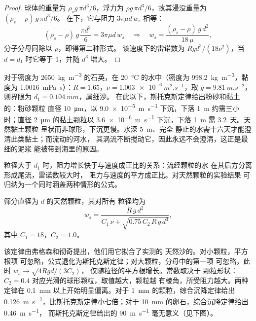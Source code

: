 \begin{proof}
球体的重量为 $\rho_s g\,\pi d^3/6$，浮力为
$\rho g\,\pi d^3/6$，故其浸没重量为 $(\rho_s - \rho)\,g\,\pi d^3/6$。
在下，它与阻力 $3\pi\mu d\,w_s$ 相等：
\[
  (\rho_s - \rho)\,g\,\frac{\pi d^3}{6} = 3\pi\mu d\,w_s
  \quad\Longrightarrow\quad
  w_s = \frac{(\rho_s - \rho)\,g\,d^2}{18\,\mu},
\]
分子分母同除以 $\rho$，即得第二种形式。
该速度下的雷诺数为 $R g d^3/(18\nu^2)$，当
$d = d_1$ 时它等于 1，并随 $d^3$ 增大。
\end{proof}

对于密度为 \qty{2650}{kg.m^{-3}} 的石英，在 \qty{20}{\celsius}
的水中（密度为 \qty{998.2}{kg.m^{-3}}，黏度为 \qty{1.0016}{mPa.s}）：$R =
1.65$，$\nu = \qty{1.003e-6}{m^2.s^{-1}}$，取 $g =
\qty{9.81}{m.s^{-2}}$，则界限为 $d_1 = \qty{0.104}{mm}$，属细沙。
在此以下，斯托克斯定律给出粉砂和黏土的：粉砂颗粒
直径 \qty{10}{\micro m}，以 \qty{9.0e-5}{m.s^{-1}} 下沉，下落 \qty{1}{m}
约需三小时；直径 \qty{2}{\micro m} 的黏土颗粒以
\qty{3.6e-6}{m.s^{-1}} 下沉，下落 \qty{1}{m} 需 \num{3.2}~天。天然黏土颗粒
呈状而非球形，下沉更慢。水深 \qty{5}{m}、完全
静止的水需十六天才能澄清此类黏土；而流动的河水，
其涡流不断搅动它，因此永远不会澄清，这正是最细的泥浆
能被带到海里的原因。

粒径大于 $d_1$ 时，阻力增长快于与速度成正比的关系：流经颗粒的水
在其后方分离形成尾流，雷诺数较大时，
阻力与速度的平方成正比。对天然颗粒的实验结果
可归纳为一个同时涵盖两种情形的公式。

\begin{proposition}[综合沉降定律]\label{prop:b1:erosion-transport:combined}
筛分直径为 $d$ 的天然颗粒，其对所有
粒径均为
\[
  w_s = \frac{R\,g\,d^2}{C_1\,\nu + \sqrt{0.75\,C_2\,R\,g\,d^3}},
\]
其中 $C_1 = 18$，$C_2 = 1.0$。
\end{proposition}
\admitted

该定律由弗格森和彻奇提出，他们用它拟合了实测的
天然沙的。对小颗粒，平方根项
可忽略，公式退化为斯托克斯定律；对大颗粒，分母中的第一项
可忽略，此时 $w_s \to \sqrt{4 R g d/(3 C_2)}$，
仅随粒径的平方根增长。常数取决于
颗粒形状：$C_2 = 0.4$ 对应光滑的球形颗粒，取值越大，颗粒越
有棱角，所受阻力越大。两种定律在
\qty{0.1}{mm} 以上开始明显偏离。对于 \qty{1}{mm} 的颗粒，综合沉降定律给出
\qty{0.126}{m.s^{-1}}，比斯托克斯定律小七倍；对于
\qty{10}{mm} 的卵石，综合沉降定律给出 \qty{0.46}{m.s^{-1}}，
而斯托克斯定律给出的 \qty{90}{m.s^{-1}} 毫无意义（见下图）。

